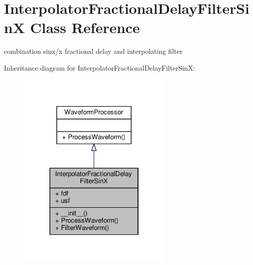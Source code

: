 \hypertarget{classSignalIntegrity_1_1TimeDomain_1_1Filters_1_1InterpolatorSinX_1_1InterpolatorFractionalDelayFilterSinX}{}\section{Interpolator\+Fractional\+Delay\+Filter\+SinX Class Reference}
\label{classSignalIntegrity_1_1TimeDomain_1_1Filters_1_1InterpolatorSinX_1_1InterpolatorFractionalDelayFilterSinX}


combination sinx/x fractional delay and interpolating filter  




Inheritance diagram for Interpolator\+Fractional\+Delay\+Filter\+SinX\+:
\nopagebreak
\begin{figure}[H]
\begin{center}
\leavevmode
\includegraphics[width=214pt]{classSignalIntegrity_1_1TimeDomain_1_1Filters_1_1InterpolatorSinX_1_1InterpolatorFractionalDelayFilterSinX__inherit__graph}
\end{center}
\end{figure}


